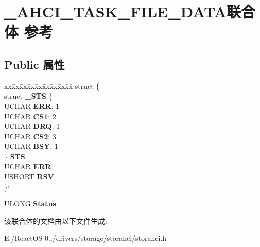 \hypertarget{union___a_h_c_i___t_a_s_k___f_i_l_e___d_a_t_a}{}\section{\+\_\+\+A\+H\+C\+I\+\_\+\+T\+A\+S\+K\+\_\+\+F\+I\+L\+E\+\_\+\+D\+A\+T\+A联合体 参考}
\label{union___a_h_c_i___t_a_s_k___f_i_l_e___d_a_t_a}
\subsection*{Public 属性}
\begin{DoxyCompactItemize}
\item 
\mbox{\label{union___a_h_c_i___t_a_s_k___f_i_l_e___d_a_t_a_ac483671ff7a4abefa2fdf97b99b37072}} 
\begin{tabbing}
xx\=xx\=xx\=xx\=xx\=xx\=xx\=xx\=xx\=\kill
struct \{\\
\>struct {\bfseries \_STS} \{\\
\>\>UCHAR {\bfseries ERR}: 1\\
\>\>UCHAR {\bfseries CS1}: 2\\
\>\>UCHAR {\bfseries DRQ}: 1\\
\>\>UCHAR {\bfseries CS2}: 3\\
\>\>UCHAR {\bfseries BSY}: 1\\
\>\} {\bfseries STS}\\
\>UCHAR {\bfseries ERR}\\
\>USHORT {\bfseries RSV}\\
\}; \\

\end{tabbing}\item 
\mbox{\label{union___a_h_c_i___t_a_s_k___f_i_l_e___d_a_t_a_a42d6a875239db235fa6fdc7977d76be0}} 
U\+L\+O\+NG {\bfseries Status}
\end{DoxyCompactItemize}


该联合体的文档由以下文件生成\+:\begin{DoxyCompactItemize}
\item 
E\+:/\+React\+O\+S-\/0../drivers/storage/storahci/storahci.\+h\end{DoxyCompactItemize}
